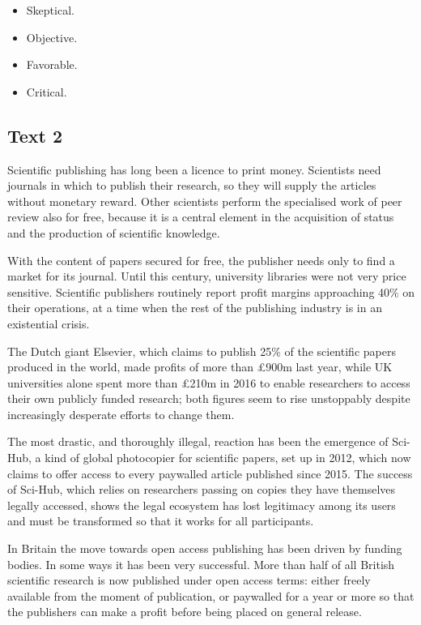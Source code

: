 \documentclass[UTF8,11pt]{ctexart}
\begin{document}
\begin{itemize}[leftmargin=2em,itemsep=.2em,topsep=.4em]\item[A.] Skeptical.
\item[B.] Objective.
\item[C.] Favorable.
\item[D.] Critical.
\end{itemize}

\subsection*{\textbf{Text 2}}


Scientific publishing has long been a licence to print money. Scientists need journals in which to publish their research, so they will supply the articles without monetary reward. Other scientists perform the specialised work of peer review also for free, because it is a central element in the acquisition of status and the production of scientific knowledge.


With the content of papers secured for free, the publisher needs only to find a market for its journal. Until this century, university libraries were not very price sensitive. Scientific publishers routinely report profit margins approaching 40\% on their operations, at a time when the rest of the publishing industry is in an existential crisis.


The Dutch giant Elsevier, which claims to publish 25\% of the scientific papers produced in the world, made profits of more than £900m last year, while UK universities alone spent more than £210m in 2016 to enable researchers to access their own publicly funded research; both figures seem to rise unstoppably despite increasingly desperate efforts to change them.


The most drastic, and thoroughly illegal, reaction has been the emergence of Sci-Hub, a kind of global photocopier for scientific papers, set up in 2012, which now claims to offer access to every paywalled article published since 2015. The success of Sci-Hub, which relies on researchers passing on copies they have themselves legally accessed, shows the legal ecosystem has lost legitimacy among its users and must be transformed so that it works for all participants.


In Britain the move towards open access publishing has been driven by funding bodies. In some ways it has been very successful. More than half of all British scientific research is now published under open access terms: either freely available from the moment of publication, or paywalled for a year or more so that the publishers can make a profit before being placed on general release.
\end{document}
